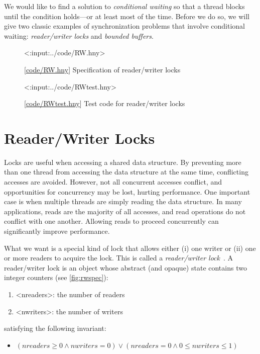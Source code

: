 \documentclass{report}
\newcommand{\harmonylink}[1]{%
[\href{https://harmony.cs.cornell.edu/#1}{\underline{#1}}]%
}
\newenvironment{code}{
\tcolorbox
}{
\endtcolorbox
}
\begin{document}
We would like to find a solution to \emph{conditional waiting}
so that a thread blocks until the condition holds---or at least most
of the time.
Before we do so, we will give two classic examples of synchronization
problems that involve conditional waiting: \emph{reader/writer locks}
and \emph{bounded buffers}.

\begin{figure}
\begin{code}
<{:input:../code/RW.hny}>
\end{code}
\caption{\harmonylink{code/RW.hny} Specification of reader/writer locks}
\label{fig:rwspec}
\end{figure}

\begin{figure}
\begin{code}
<{:input:../code/RWtest.hny}>
\end{code}
\caption{\harmonylink{code/RWtest.hny} Test code for reader/writer locks}
\label{fig:rwtest}
\end{figure}

\section{Reader/Writer Locks}
%
%

Locks are useful when accessing a shared data structure.  By preventing
more than one thread from accessing the data structure at the same
time, conflicting accesses are avoided.  However, not all concurrent
accesses conflict, and opportunities for concurrency may be lost,
hurting performance.  One important case is when multiple threads
are simply reading the data structure.
In many applications, reads are the majority of all accesses,
and read operations do not conflict with one another.
Allowing reads to proceed concurrently can significantly improve performance.

What we want is a special kind of lock that allows either (i) one writer
or (ii) one or more readers to acquire the lock.  This is called
a \emph{reader/writer lock}~\cite{CHP71}.
%
A reader/writer lock is an object whose abstract (and opaque)
state contains two integer counters (see \autoref{fig:rwspec}):
\begin{enumerate}
\item <{nreaders}>: the number of readers
\item <{nwriters}>: the number of writers
\end{enumerate}
satisfying the following invariant:
\begin{itemize}
\item [] $(\mathit{nreaders} \ge 0 \land \mathit{nwriters} = 0) \lor
    (\mathit{nreaders} = 0 \land 0 \le \mathit{nwriters} \le 1)$
\end{itemize}
\end{document}
